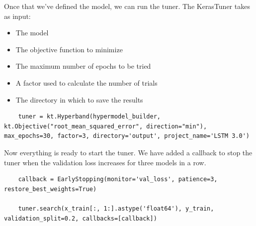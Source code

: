 Once that we've defined the model, we can run the tuner. The KerasTuner takes as input: 
\begin{itemize}
    \item The model
    \item The objective function to minimize
    \item The maximum number of epochs to be tried
    \item A factor used to calculate the number of trials 
    \item The directory in which to save the results
\end{itemize}
\begin{verbatim}
    tuner = kt.Hyperband(hypermodel_builder, kt.Objective("root_mean_squared_error", direction="min"), max_epochs=30, factor=3, directory='output', project_name='LSTM 3.0')
\end{verbatim}
Now everything is ready to start the tuner. We have added a callback to stop the tuner when the validation loss increases for three models in a row.
\begin{verbatim}
    callback = EarlyStopping(monitor='val_loss', patience=3, restore_best_weights=True)
    
    tuner.search(x_train[:, 1:].astype('float64'), y_train, validation_split=0.2, callbacks=[callback])
\end{verbatim}

